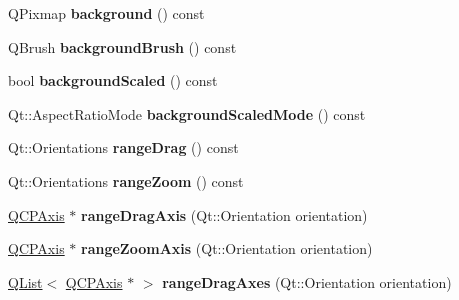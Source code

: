 \begin{DoxyCompactItemize}
\item 
Q\+Pixmap {\bfseries background} () const \hypertarget{class_q_c_p_axis_rect_a0daa1dadd2a62dbfa37b7f742edd0059}{}\label{class_q_c_p_axis_rect_a0daa1dadd2a62dbfa37b7f742edd0059}

\item 
Q\+Brush {\bfseries background\+Brush} () const \hypertarget{class_q_c_p_axis_rect_a6f8f9f9ff63a803a3cf8796e77a98123}{}\label{class_q_c_p_axis_rect_a6f8f9f9ff63a803a3cf8796e77a98123}

\item 
bool {\bfseries background\+Scaled} () const \hypertarget{class_q_c_p_axis_rect_a67c18777b88fe9c81dee3dd2b5f50e5c}{}\label{class_q_c_p_axis_rect_a67c18777b88fe9c81dee3dd2b5f50e5c}

\item 
Qt\+::\+Aspect\+Ratio\+Mode {\bfseries background\+Scaled\+Mode} () const \hypertarget{class_q_c_p_axis_rect_a3d0f42d6be11a0b3d4576402a2b0032d}{}\label{class_q_c_p_axis_rect_a3d0f42d6be11a0b3d4576402a2b0032d}

\item 
Qt\+::\+Orientations {\bfseries range\+Drag} () const \hypertarget{class_q_c_p_axis_rect_af24b46954ce27a26b23770cdb8319080}{}\label{class_q_c_p_axis_rect_af24b46954ce27a26b23770cdb8319080}

\item 
Qt\+::\+Orientations {\bfseries range\+Zoom} () const \hypertarget{class_q_c_p_axis_rect_a3397fc60e5df29089090bc236e9f05f6}{}\label{class_q_c_p_axis_rect_a3397fc60e5df29089090bc236e9f05f6}

\item 
\hyperlink{class_q_c_p_axis}{Q\+C\+P\+Axis} $\ast$ {\bfseries range\+Drag\+Axis} (Qt\+::\+Orientation orientation)\hypertarget{class_q_c_p_axis_rect_a0fcc12c5a91eb51a89719b0726955d8a}{}\label{class_q_c_p_axis_rect_a0fcc12c5a91eb51a89719b0726955d8a}

\item 
\hyperlink{class_q_c_p_axis}{Q\+C\+P\+Axis} $\ast$ {\bfseries range\+Zoom\+Axis} (Qt\+::\+Orientation orientation)\hypertarget{class_q_c_p_axis_rect_a28b74801ba16e7051e44b711613c526f}{}\label{class_q_c_p_axis_rect_a28b74801ba16e7051e44b711613c526f}

\item 
\hyperlink{class_q_list}{Q\+List}$<$ \hyperlink{class_q_c_p_axis}{Q\+C\+P\+Axis} $\ast$ $>$ {\bfseries range\+Drag\+Axes} (Qt\+::\+Orientation orientation)\hypertarget{class_q_c_p_axis_rect_ac5235fb4d169970a1270b5768c85cc73}{}\label{class_q_c_p_axis_rect_ac5235fb4d169970a1270b5768c85cc73}


\end{DoxyCompactItemize}
